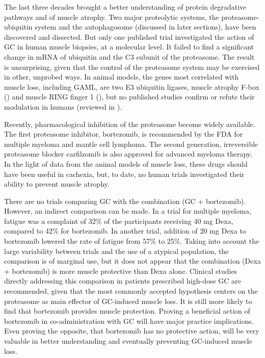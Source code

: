 \documentclass[12pt,english]{report}\usepackage[]{graphicx}\usepackage[]{color}
\begin{document}
The last three decades brought a better understanding of protein degradative
pathways and of muscle atrophy. Two major proteolytic systems, the
proteasome-ubiquitin system and the autophagosome (discussed in later
sections), have been discovered and dissected. But only one published
trial investigated the action of GC in human muscle biopsies, at a
molecular level. It failed to find a significant change in mRNA of
ubiquitin and the C3 subunit of the proteasome\citep{lofberg2002effects}.
The result is unsurprising, given that the control of the proteasome
system may be exercised in other, unprobed ways. In animal models,
the genes most correlated with muscle loss, including GAML, are two
E3 ubiquitin ligases, muscle atrophy F-box ()
and muscle RING finger 1 (),
but no published studies confirm or refute their modulation in humans
(reviewed in \citep{bodine2014skeletal}).

Recently, pharmacological inhibition of the proteasome become widely
available. The first proteasome inhibitor, bortezomib, is recommended
by the FDA for multiple myeloma and mantle cell lymphoma\citep{milleniumpharmaceuticalsinc.2014velcade}.
The second generation, irreversible proteasome blocker carfilzomib
is also approved for advanced myeloma therapy\citep{onyxpharmaceuticalsinc.2012kyprolis}.
In the light of data from the animal models of muscle loss, these
drugs should have been useful in cachexia, but, to date, no human
trials investigated their ability to prevent muscle atrophy. 

There are no trials comparing GC with the combination (GC + bortezomib).
However, an indirect comparison can be made. In a trial for multiple
myeloma, fatigue was a complaint of 32\% of the participants receiving
40 mg Dexa, compared to 42\% for bortezomib\citep{richardson2007safety}.
In another trial, addition of 20 mg Dexa to bortezomib lowered the
rate of fatigue from 57\% to 25\%\citep{jagannath2006bortezomib}.
Taking into account the large variability between trials and the use
of a atypical population, the comparison is of marginal use, but it
does not appear that the combination (Dexa + bortezomib) is more muscle
protective than Dexa alone. Clinical studies directly addressing this
comparison in patients prescribed high-dose GC are recommended, given
that the most commonly accepted hypothesis centers on the proteasome
as main effector of GC-induced muscle loss. It is still more likely
to find that bortezomib provides muscle protection. Proving a beneficial
action of bortezomib in co-administration with GC will have major
practice implications. Even proving the opposite, that bortezomib
has no protective action, will be very valuable in better understanding
and eventually preventing GC-induced muscle loss.
\end{document}
